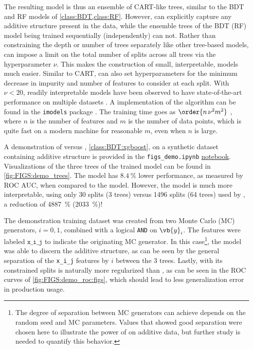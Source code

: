 The resulting \figs model is thus an ensemble of CART-like trees,
similar to the BDT and RF models of \cref{class:BDT,class:RF}.
However, \figs can explicitly capture any additive structure present in the data,
while the ensemble trees of the BDT (RF) model being trained sequentially (independently) can not.
Rather than constraining the depth or number of trees separately like other tree-based models,
\figs can impose a limit on the total number of splits across all trees via the hyperparameter $\nu$.
This makes the construction of small, interpretable, models much easier.
Similar to CART, \figs can also set hyperparameters for
the minimum decrease in impurity and
number of features to consider at each split.
With $\nu < 20$, readily interpretable \figs models have been observed
to have state-of-the-art performance on multiple datasets \cite{FIGS}.
A \python implementation of the \figs algorithm can be found in the \texttt{imodels} package \cite{imodels}.
The \figs training time goes as $\order{n \, \nu^{2} m^{2}}$ \cite{FIGS},
where $n$ is the number of features and $m$ is the number of data points,
which is quite fast on a modern machine for reasonable $m$, even when $n$ is large.

A demonstration of \figs versus \xgboost, \cref{class:BDT:xgboost},
on a synthetic dataset containing additive structure
is provided in the \texttt{figs\_demo.ipynb} \href{https://github.com/mepland/data_science_notes/blob/main/plots/figs_demo.ipynb}{notebook}.
Visualizations of the three trees of the trained \figs model can be found in \cref{fig:FIGS:demo_trees}.
The \figs model has $\SI{8.4}{\percent}$ lower performance, as measured by ROC AUC, when compared to the \xgboost model.
However, the \figs model is much more interpretable,
using only \num{30} splits (\num{3} trees) versus \num{1496} splits (\num{64} trees) used by \xgboost,
a reduction of \SI{4887}{\percent} (\SI{2033}{\percent})!

The demonstration training dataset was created from two Monte Carlo (MC) generators, $i=0,1$,
combined with a logical \texttt{AND} on $\vb{y}_{i}$.
The features were labeled $\texttt{x\_i\_j}$ to indicate the originating MC generator.
In this case\footnote{The degree of separation between MC generators
\figs can achieve depends on the random seed and MC parameters.
Values that showed good separation were chosen here to illustrate
the power of \figs on additive data,
but further study is needed to quantify this behavior.},
the \figs model was able to discern the additive structure,
as can be seen by the general separation of the \texttt{x\_i\_j} features by $i$ between the \num{3} trees.
Lastly, with its constrained splits \figs is naturally more regularized than \xgboost,
as can be seen in the ROC curves of \cref{fig:FIGS:demo_roc:figs},
which should lead to less generalization error in production usage.

